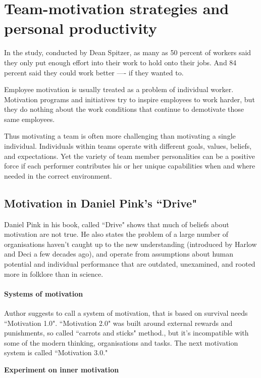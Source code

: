 \chapter{Team-motivation strategies and personal productivity}

In the study, conducted by Dean Spitzer, as many as 50 percent of workers said they only put enough effort into their work to hold onto their jobs. And 84 percent said they could work better —- if they wanted to. \cite{spitzer}

Employee motivation is usually treated as a problem of individual worker. Motivation programs and initiatives try to inspire employees to work harder, but they do nothing about the work conditions that continue to demotivate those same employees.

Thus motivating a team is often more challenging than motivating a single individual. Individuals within teams operate with different goals, values, beliefs, and expectations. Yet the variety of team member personalities can be a positive force if each performer contributes his or her unique capabilities when and where needed \cite{clark-team-motivation} in the correct environment.

\section{Motivation in Daniel Pink's ``Drive"}

Daniel Pink in his book, called ``Drive" shows that much of beliefs about motivation are not true. He also states the problem of a large number of organisations haven't caught up to the new understanding (introduced by Harlow and Deci a few decades ago), and operate from assumptions about human potential and individual performance that are outdated, unexamined, and rooted more in folklore than in science. 

\subsubsection{Systems of motivation}

Author suggests to call a system of motivation, that is based on survival needs ``Motivation 1.0". ``Motivation 2.0" was built around external rewards and punishments, so called ``carrots and sticks" method., but it's incompatible with some of the modern thinking, organisations and tasks. The next motivation system is called ``Motivation 3.0."

\textbf{Experiment on inner motivation}


